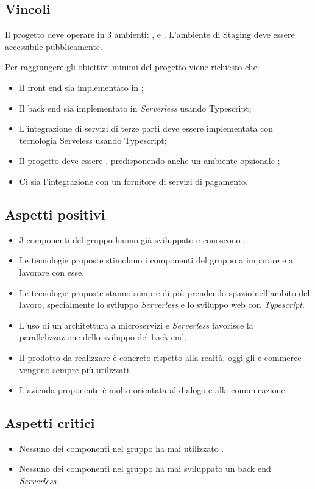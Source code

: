 \subsection{Vincoli}
Il progetto deve operare in 3 ambienti: ,  e . L'ambiente di Staging deve essere accessibile pubblicamente.

Per raggiungere gli obiettivi minimi del progetto viene richiesto che:
\begin{itemize}
	\item Il front end sia implementato in \textit{};
	\item Il back end sia implementato in \textit{Serverless} usando Typescript;
	\item L'integrazione di servizi di terze parti deve essere implementata con tecnologia Serveless usando Typescript;
	\item Il progetto deve essere , predisponendo anche un ambiente opzionale ;
	\item Ci sia l'integrazione con un fornitore di servizi di pagamento.
\end{itemize}

\subsection{Aspetti positivi}
\begin{itemize}
	\item 3 componenti del gruppo hanno già sviluppato e conoscono \textit{}.
	\item Le tecnologie proposte stimolano i componenti del gruppo a imparare e a lavorare con esse.
	\item Le tecnologie proposte stanno sempre di più prendendo spazio nell'ambito del lavoro, specialmente lo sviluppo \textit{Serverless} e lo sviluppo web con \textit{Typescript}.
	\item L'uso di un'architettura a microservizi e \textit{Serverless} favorisce la parallelizzazione dello sviluppo del back end.
	\item Il prodotto da realizzare è concreto rispetto alla realtà, oggi gli e-commerce vengono sempre più utilizzati.
	\item L'azienda proponente è molto orientata al dialogo e alla comunicazione.
\end{itemize}

\subsection{Aspetti critici}
\begin{itemize}
	\item Nessuno dei componenti nel gruppo ha mai utilizzato \textit{}.
	\item Nessuno dei componenti nel gruppo ha mai sviluppato un back end \textit{Serverless}.
\end{itemize}

